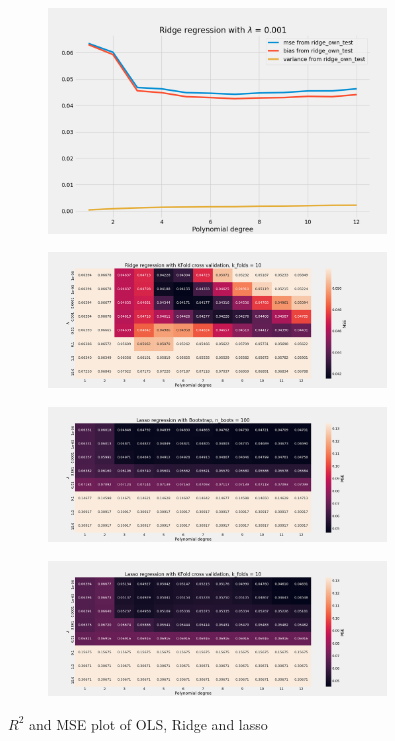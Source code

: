 \begin{figure}[H]
    \centering
    \includegraphics[width=0.8\textwidth]{Figures/e_ridge_bias_variance_lamb_0_001.png}
\end{figure}


\begin{figure}[H]
    \centering
    \includegraphics[width=0.8\textwidth]{Figures/e_ridge_kfold_n_10.png}
\end{figure}



\begin{figure}[H]
    \centering
    \includegraphics[width=0.8\textwidth]{Figures/f_lasso_bootstrap_n_100.png}
\end{figure}

\begin{figure}[H]
    \centering
    \includegraphics[width=0.8\textwidth]{Figures/f_lasso_kfold_n_10.png}
\end{figure}



 

$R^2$ and MSE plot of OLS, Ridge and lasso

